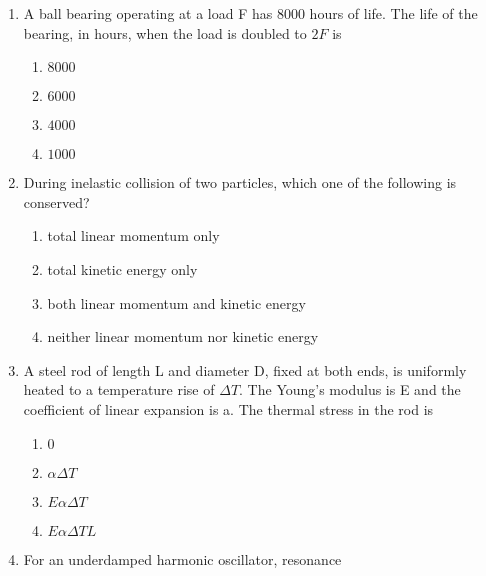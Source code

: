 \documentclass[journal]{IEEEtran}
\begin{document}
\begin{enumerate}
\begin{multicols}{4}
    \begin{enumerate}
        \item $25$
        \item $30$
        \item $35$
        \item $60$
    \end{enumerate}
\end{multicols}
\bigskip
\item A ball bearing operating at a load F has 8000 hours of life. The life of the bearing, in hours, when the load is doubled to $2F$ is
\begin{multicols}{4}
    \begin{enumerate}
        \item $8000$
        \item $6000$
        \item $4000$
        \item $1000$
    \end{enumerate}
\end{multicols}
\bigskip
\item During inelastic collision of two particles, which one of the following is conserved?
\begin{enumerate}
        \item total linear momentum only
        \item total kinetic energy only
        \item both linear momentum and kinetic energy
        \item neither linear momentum nor kinetic energy 
\end{enumerate}
\bigskip
\item A steel rod of length L and diameter D, fixed at both ends, is uniformly heated to a temperature rise of $\Delta T$. The Young's modulus is E and the coefficient of linear expansion is a. The thermal stress in the rod is
\begin{multicols}{4}
    \begin{enumerate}
        \item $0$
        \item $\alpha\Delta T$
        \item $E\alpha\Delta T$
        \item $E\alpha\Delta TL$
    \end{enumerate}
\end{multicols}
\bigskip
\item For an underdamped harmonic oscillator, resonance


\end{enumerate}
\end{document}
